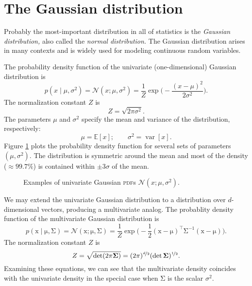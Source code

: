 \documentclass{article}
\newcommand{\acro}[1]{\textsc{\MakeLowercase{#1}}}
\newcommand{\given}{\mid}
\newcommand{\mc}[1]{\mathcal{#1}}
\newcommand{\inv}{^{-1}}
\newcommand{\trans}{^\top}
\newcommand{\mat}[1]{\bm{\mathrm{#1}}}
\renewcommand{\vec}[1]{\bm{\mathrm{#1}}}
\DeclareMathOperator{\var}{var}
\begin{document}
\section*{The Gaussian distribution}
Probably the most-important distribution in all of statistics is the
\emph{Gaussian distribution,} also called the \emph{normal
  distribution.}  The Gaussian distribution arises in many contexts
and is widely used for modeling continuous random variables.

The probability density function of the univariate (one-dimensional)
Gaussian distribution is
\begin{equation*}
  p(x \given \mu, \sigma^2)
  =
  \mc{N}(x; \mu, \sigma^2)
  =
  \frac{1}{Z}
  \exp\biggl(
  -\frac{(x - \mu)^2}{2 \sigma^2}
  \biggr).
\end{equation*}
The normalization constant $Z$ is
\begin{equation*}
  Z = \sqrt{2 \pi \sigma^2}.
\end{equation*}
The parameters $\mu$ and $\sigma^2$ specify the mean and variance
of the distribution, respectively:
\begin{equation*}
  \mu = \mathbb{E}[x]; \qquad
  \sigma^2 = \var[x].
\end{equation*}
Figure \ref{1d_examples} plots the probability density function for
several sets of parameters $(\mu, \sigma^2)$.  The distribution is
symmetric around the mean and most of the density ($\approx 99.7\%$)
is contained within $\pm 3 \sigma$ of the mean.

\begin{figure}
  \centering
  
  \caption{Examples of univariate Gaussian \acro{PDF}s $\mc{N}(x; \mu,
    \sigma^2)$.}
  \label{1d_examples}
\end{figure}

We may extend the univariate Gaussian distribution to a distribution
over $d$-dimensional vectors, producing a multivariate analog.  The
probablity density function of the multivariate Gaussian distribution
is
\begin{equation*}
  p(\vec{x} \given \vec{\mu}, \mat{\Sigma})
  =
  \mc{N}(\vec{x}; \vec{\mu}, \mat{\Sigma})
  =
  \frac{1}{Z}
  \exp\biggl(
  -\frac{1}{2}
  (\vec{x} - \vec{\mu})\trans
  \mat{\Sigma}\inv
  (\vec{x} - \vec{\mu})
  \biggr).
\end{equation*}
The normalization constant $Z$ is
\begin{equation*}
  Z = \sqrt{\det (2 \pi \mat{\Sigma})}
    = (2 \pi)^{\nicefrac{d}{2}} (\det \mat{\Sigma})^{\nicefrac{1}{2}}.
\end{equation*}
Examining these equations, we can see that the multivariate density
coincides with the univariate density in the special case
when $\mat{\Sigma}$ is the scalar $\sigma^2$.
\end{document}
